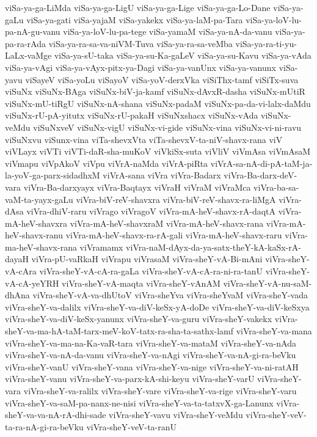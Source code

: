 {viSa-ya-ga-LiMda
viSa-ya-ga-LigU
viSa-ya-ga-Lige
viSa-ya-ga-Lo-Dane
viSa-ya-gaLu
viSa-ya-gati
viSa-yajaM
viSa-yakekx
viSa-ya-laM-pa-Tara
viSa-ya-loV-lu-pa-nA-gu-vanu
viSa-ya-loV-lu-pa-tege
viSa-yamaM
viSa-ya-nA-da-vanu
viSa-ya-pa-ra-rAda
viSa-ya-ra-sa-va-niVM-Tuva
viSa-ya-ra-sa-veMba
viSa-ya-ra-ti-yu-LaLx-vaMge
viSa-ya-sU-taka
viSa-ya-su-Ka-gaLeV
viSa-ya-su-Kavu
viSa-ya-vAda
viSa-ya-vAgi
viSa-ya-vAyx-pitx-ya-Dagi
viSa-ya-vanUnx
viSa-ya-vanunx
viSa-yavu
viSayeV
viSa-yoLu
viSayoV
viSa-yoV-derxVka
viSiThx-tamf
viSiTx-suva
viSuNx
viSuNx-BAga
viSuNx-biV-ja-kamf
viSuNx-dAvxR-dasha
viSuNx-mUtiR
viSuNx-mU-tiRgU
viSuNx-nA-shana
viSuNx-padaM
viSuNx-pa-da-vi-lalx-daMdu
viSuNx-rU-pA-yitutx
viSuNx-rU-pakaH
viSuNxshacx
viSuNx-vAda
viSuNx-veMdu
viSuNxveV
viSuNx-vigU
viSuNx-vi-gide
viSuNx-vina
viSuNx-vi-ni-ravu
viSuNxvu
viSunx-vina
viTa-shevxVta
viTa-shevxV-ta-niV-shavx-rana
viV
viVLayx
viVTi
viVTi-daR-sha-muKoV
viVkiSx-suta
viVliV
viVmAsa
viVmAsaM
viVmapu
viVpAkoV
viVpu
viVrA-naMda
viVrA-piRta
viVrA-sa-nA-di-pA-taM-ja-la-yoV-ga-parx-sidadhxM
viVrA-sana
viVra
viVra-Badarx
viVra-Ba-darx-deV-vara
viVra-Ba-darxyayx
viVra-Baqtayx
viVraH
viVraM
viVraMca
viVra-ba-sa-vaM-ta-yayx-gaLu
viVra-biV-reV-shavxra
viVra-biV-reV-shavx-ra-liMgA
viVra-dAsa
viVra-dhiV-raru
viVrago
viVragoV
viVra-mA-heV-shavx-rA-daqtA
viVra-mA-heV-shavxra
viVra-mA-heV-shavxraM
viVra-mA-heV-shavx-rana
viVra-mA-heV-shavx-ranu
viVra-mA-heV-shavx-ra-rA-gali
viVra-mA-heV-shavx-raru
viVra-ma-heV-shavx-rana
viVramamx
viVra-naM-dAyx-da-ya-satx-theY-kA-kaSx-rA-dayaH
viVra-pU-vaRkaH
viVrapu
viVrasaM
viVra-sheY-vA-Bi-mAni
viVra-sheY-vA-cAra
viVra-sheY-vA-cA-ra-gaLa
viVra-sheY-vA-cA-ra-ni-ra-tanU
viVra-sheY-vA-cA-yeYRH
viVra-sheY-vA-maqta
viVra-sheY-vAnAM
viVra-sheY-vA-nu-saM-dhAna
viVra-sheY-vA-va-dhUtoV
viVra-sheYva
viVra-sheYvaM
viVra-sheY-vada
viVra-sheY-va-dalilx
viVra-sheY-va-diV-keSx-yA-doDe
viVra-sheY-va-diV-keSxya
viVra-sheY-va-diV-keSx-yanunx
viVra-sheY-va-guru
viVra-sheY-vakekx
viVra-sheY-va-ma-hA-taM-tarx-meV-koV-tatx-ra-sha-ta-sathx-lamf
viVra-sheY-va-mana
viVra-sheY-va-ma-na-Ka-vaR-tara
viVra-sheY-va-mataM
viVra-sheY-va-nAda
viVra-sheY-va-nA-da-vanu
viVra-sheY-va-nAgi
viVra-sheY-va-nA-gi-ra-beVku
viVra-sheY-vanU
viVra-sheY-vana
viVra-sheY-va-nige
viVra-sheY-va-ni-ratAH
viVra-sheY-vanu
viVra-sheY-va-parx-kA-shi-keyu
viVra-sheY-varU
viVra-sheY-vara
viVra-sheY-va-ralilx
viVra-sheY-vare
viVra-sheY-va-rige
viVra-sheY-varu
viVra-sheY-va-saM-pa-nanx-ne-nisi
viVra-sheY-va-ta-tatxvX-ga-Lanunx
viVra-sheY-va-va-nA-rA-dhi-sade
viVra-sheY-vavu
viVra-sheY-veMdu
viVra-sheY-veV-ta-ra-nA-gi-ra-beVku
viVra-sheY-veV-ta-ranU
}
